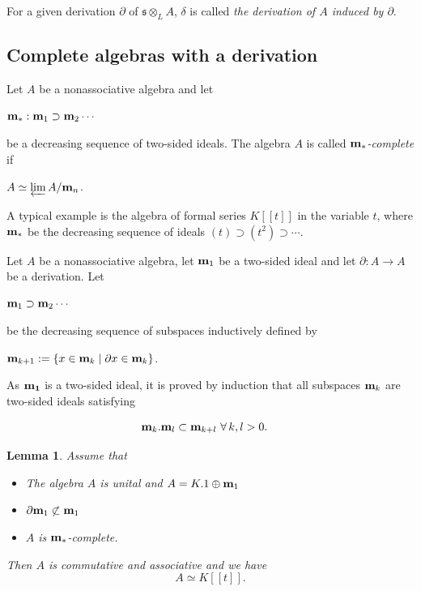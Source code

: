 \documentclass[11pt, letterpaper, reqno]{amsart}
\newtheorem{lemma}[theorem]{Lemma}
\theoremstyle{definition}
\newcommand{\fs}{\mathfrak{s}}
\begin{document}
For a given derivation $\partial$ of
$\fs\otimes_L A$,  $\delta$ 
is called {\it the derivation of $A$ induced by $\partial$}.

\subsection{Complete algebras with a derivation}\label{complete}

Let $A$ be a nonassociative  algebra and let

\centerline{${\bf m}_*: {\bf m}_1\supset {\bf m}_2\cdots$}

\noindent  be a decreasing 
sequence of two-sided ideals. 
The algebra $A$ is called {\it ${\bf m}_*$-complete} if 

\centerline{$A \simeq \varprojlim A/{\bf m}_n$.}

\noindent A typical example is the algebra of formal series  $K[[t]]$ in the variable $t$,  where ${\bf m}_*$ be the
decreasing  sequence of ideals $(t)\supset (t^2)\supset\cdots$. 

Let $A$ be a  nonassociative algebra, let
${\bf m}_1$ be a two-sided ideal and 
let $\partial:A\to A$ be a derivation. Let 

\centerline{${\bf m}_1\supset {\bf m}_2\cdots$}

\noindent  be the decreasing 
sequence of subspaces inductively defined by

\centerline{
${\bf m}_{k+1}:=\{x\in {\bf m}_k\mid \partial x\in{\bf m}_k\}$.}

\noindent As ${\bf m_1}$ is a two-sided ideal, it is proved by induction  that all subspaces ${\bf m}_k$ are two-sided ideals satisfying

\begin{align}
{\bf m}_k.{\bf m}_l&\subset {\bf m}_{k+l}\,\,
\forall \,k,l>0. \label{ideal-condition}
\end{align}


\begin{lemma}\label{formalseries} Assume that 

\begin{itemize}
\item[(a)] The algebra $A$ is unital and 
$A=K.1\oplus {\bf m}_1$

\item[(b)] $\partial {\bf m}_1\not\subset {\bf m}_1$

\item[(c)] $A$ is ${\bf m}_*$-complete.
\end{itemize}

Then $A$ is commutative and associative and we have
$$A\simeq K[[t]].$$
\end{lemma}
\end{document}
